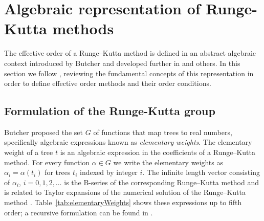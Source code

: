 \section{Algebraic representation of Runge-Kutta methods}\label{sec:Algebraic_RK}

The effective order of a Runge--Kutta method is defined in an abstract algebraic
context introduced by Butcher \cite{Butcher1969} and developed further in
\cite{Butcher1972, Hairer1974, Butcher1996, Butcher1998} and others.
In this section we follow \cite{Butcher2008_book}, reviewing the fundamental
concepts of this representation in order to define effective order methods
and their order conditions.


\subsection{Formulation of the Runge-Kutta group}\label{sec:RK_group}



Butcher \cite{Butcher1972} proposed the set $G$ of functions that map
trees to real numbers, specifically algebraic expressions known as
\emph{elementary weights}.
The elementary weight of a tree $t$
is an algebraic expression in the coefficients of a Runge--Kutta method.
For every function $\alpha \in G$ we write the elementary weights as
$\alpha_{i} = \alpha(t_{i})$
for trees $t_{i}$ indexed by integer $i$.
The infinite length vector consisting of $\alpha_i$, $i = 0, 1, 2,
\ldots$ is the B-series of the corresponding Runge--Kutta method and
is related to Taylor expansions of the numerical solution of the
Runge--Kutta method \cite{Hairer1974, Butcher2008_book}.
Table~\ref{tab:elementaryWeights} shows these
expressions up to fifth order; a recursive formulation
can be found in \cite[Definition 312]{Butcher2008_book}.



